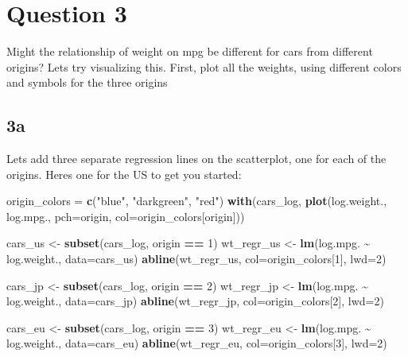 \documentclass[
]{article}
\newenvironment{Shaded}{\begin{snugshade}}{\end{snugshade}}
\newcommand{\AttributeTok}[1]{\textcolor[rgb]{0.13,0.29,0.53}{#1}}
\newcommand{\DecValTok}[1]{\textcolor[rgb]{0.00,0.00,0.81}{#1}}
\newcommand{\FunctionTok}[1]{\textcolor[rgb]{0.13,0.29,0.53}{\textbf{#1}}}
\newcommand{\NormalTok}[1]{#1}
\newcommand{\OtherTok}[1]{\textcolor[rgb]{0.56,0.35,0.01}{#1}}
\newcommand{\SpecialCharTok}[1]{\textcolor[rgb]{0.81,0.36,0.00}{\textbf{#1}}}
\newcommand{\StringTok}[1]{\textcolor[rgb]{0.31,0.60,0.02}{#1}}
\begin{document}
\hypertarget{question-3}{%
\section{Question 3}\label{question-3}}

Might the relationship of weight on mpg be different for cars from
different origins? Let\textquotesingle s try visualizing this. First,
plot all the weights, using different colors and symbols for the three
origins

\hypertarget{a-2}{%
\subsection{3a}\label{a-2}}

Let\textquotesingle s add three separate regression lines on the
scatterplot, one for each of the origins. Here\textquotesingle s one for
the US to get you started:

\begin{Shaded}
\begin{Highlighting}[]
\NormalTok{origin\_colors }\OtherTok{=} \FunctionTok{c}\NormalTok{(}\StringTok{"blue"}\NormalTok{, }\StringTok{"darkgreen"}\NormalTok{, }\StringTok{"red"}\NormalTok{)}
\FunctionTok{with}\NormalTok{(cars\_log, }\FunctionTok{plot}\NormalTok{(log.weight., log.mpg., }\AttributeTok{pch=}\NormalTok{origin, }\AttributeTok{col=}\NormalTok{origin\_colors[origin]))}

\NormalTok{cars\_us }\OtherTok{\textless{}{-}} \FunctionTok{subset}\NormalTok{(cars\_log, origin }\SpecialCharTok{==} \DecValTok{1}\NormalTok{)}
\NormalTok{wt\_regr\_us }\OtherTok{\textless{}{-}} \FunctionTok{lm}\NormalTok{(log.mpg. }\SpecialCharTok{\textasciitilde{}}\NormalTok{ log.weight., }\AttributeTok{data=}\NormalTok{cars\_us)}
\FunctionTok{abline}\NormalTok{(wt\_regr\_us, }\AttributeTok{col=}\NormalTok{origin\_colors[}\DecValTok{1}\NormalTok{], }\AttributeTok{lwd=}\DecValTok{2}\NormalTok{)}

\NormalTok{cars\_jp }\OtherTok{\textless{}{-}} \FunctionTok{subset}\NormalTok{(cars\_log, origin }\SpecialCharTok{==} \DecValTok{2}\NormalTok{)}
\NormalTok{wt\_regr\_jp }\OtherTok{\textless{}{-}} \FunctionTok{lm}\NormalTok{(log.mpg. }\SpecialCharTok{\textasciitilde{}}\NormalTok{ log.weight., }\AttributeTok{data=}\NormalTok{cars\_jp)}
\FunctionTok{abline}\NormalTok{(wt\_regr\_jp, }\AttributeTok{col=}\NormalTok{origin\_colors[}\DecValTok{2}\NormalTok{], }\AttributeTok{lwd=}\DecValTok{2}\NormalTok{)}

\NormalTok{cars\_eu }\OtherTok{\textless{}{-}} \FunctionTok{subset}\NormalTok{(cars\_log, origin }\SpecialCharTok{==} \DecValTok{3}\NormalTok{)}
\NormalTok{wt\_regr\_eu }\OtherTok{\textless{}{-}} \FunctionTok{lm}\NormalTok{(log.mpg. }\SpecialCharTok{\textasciitilde{}}\NormalTok{ log.weight., }\AttributeTok{data=}\NormalTok{cars\_eu)}
\FunctionTok{abline}\NormalTok{(wt\_regr\_eu, }\AttributeTok{col=}\NormalTok{origin\_colors[}\DecValTok{3}\NormalTok{], }\AttributeTok{lwd=}\DecValTok{2}\NormalTok{)}
\end{Highlighting}
\end{Shaded}
\end{document}
